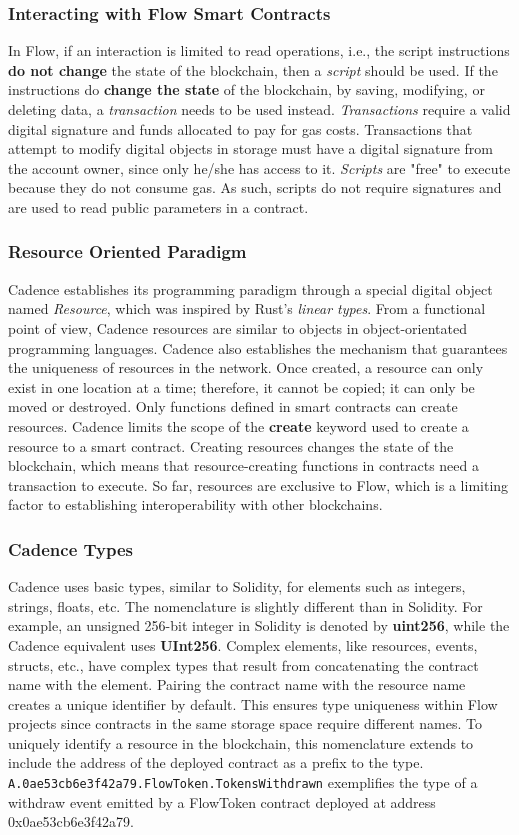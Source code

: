 \documentclass[../NFTComp_IEEE.tex]{subfiles}
\begin{document}
\subsubsection{Interacting with Flow Smart Contracts}
In Flow, if an interaction is limited to read operations, i.e., the script instructions \textbf{do not change} the state of the blockchain, then a \textit{script} should be used. If the instructions do \textbf{change the state} of the blockchain, by saving, modifying, or deleting data, a \textit{transaction} needs to be used instead. \textit{Transactions} require a valid digital signature and funds allocated to pay for gas costs. Transactions that attempt to modify digital objects in storage must have a digital signature from the account owner, since only he/she has access to it. \textit{Scripts} are "free" to execute because they do not consume gas. As such, scripts do not require signatures and are used to read public parameters in a contract.

\subsubsection{Resource Oriented Paradigm}
Cadence establishes its programming paradigm through a special digital object named \textit{Resource}, which was inspired by Rust's \textit{linear types}. From a functional point of view, Cadence resources are similar to objects in object-orientated programming languages. Cadence also establishes the mechanism that guarantees the uniqueness of resources in the network. Once created, a resource can only exist in one location at a time; therefore, it cannot be copied; it can only be moved or destroyed. Only functions defined in smart contracts can create resources. Cadence limits the scope of the \textbf{create} keyword used to create a resource to a smart contract. Creating resources changes the state of the blockchain, which means that resource-creating functions in contracts need a transaction to execute. So far, resources are exclusive to Flow, which is a limiting factor to establishing interoperability with other blockchains.

\subsubsection{Cadence Types}
Cadence uses basic types, similar to Solidity, for elements such as integers, strings, floats, etc. The nomenclature is slightly different than in Solidity. For example, an unsigned 256-bit integer in Solidity is denoted by \textbf{uint256}, while the Cadence equivalent uses \textbf{UInt256}. Complex elements, like resources, events, structs, etc., have complex types that result from concatenating the contract name with the element. Pairing the contract name with the resource name creates a unique identifier by default. This ensures type uniqueness within Flow projects since contracts in the same storage space require different names. To uniquely identify a resource in the blockchain, this nomenclature extends to include the address of the deployed contract as a prefix to the type. \verb|A.0ae53cb6e3f42a79.FlowToken.TokensWithdrawn| exemplifies the type of a withdraw event emitted by a FlowToken contract deployed at address 0x0ae53cb6e3f42a79.
\end{document}
